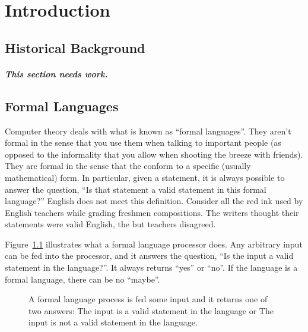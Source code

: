 \documentclass[letterpaper,12pt,openany,reqno]{book}%
\newcommand{\code}[1] {\lstinline[breaklines=yes,breakatwhitespace=yes]{#1}}
\newcommand{\needswork}{\paragraph{This section needs work.}}
\begin{document}
\chapter{Introduction}
\section{Historical Background}
\needswork
\section{Formal Languages}
Computer theory deals with what is known as ``formal languages''. They aren't formal in the sense that you use them when talking to important people (as opposed to the informality that you allow when shooting the breeze with friends). They are formal in the sense that the conform to a specific (usually mathematical) form. In particular, given a statement, it is always possible to answer the question, ``Is that statement a valid statement in this formal language?'' English does not meet this definition. Consider all the red ink used by English teachers while grading freshmen compositions. The writers thought their statements were valid English, the but teachers disagreed.

Figure~\ref{F.formal.language.processor} illustrates what a formal language processor does. Any arbitrary input can be fed into the processor, and it answers the question, ``Is the input a valid statement in the language?''. It always returns ``yes'' or ``no''. If the language is a formal language, there can be no ``maybe''.

\begin{figure}[hbt]
\centering
{}
 \caption[Formal language processor]{A formal language process is fed some input and it returns one of two answers: The input is a valid statement in the language or The input is not a valid statement in the language.}
  \label{F.formal.language.processor}
\end{figure}
\end{document}
